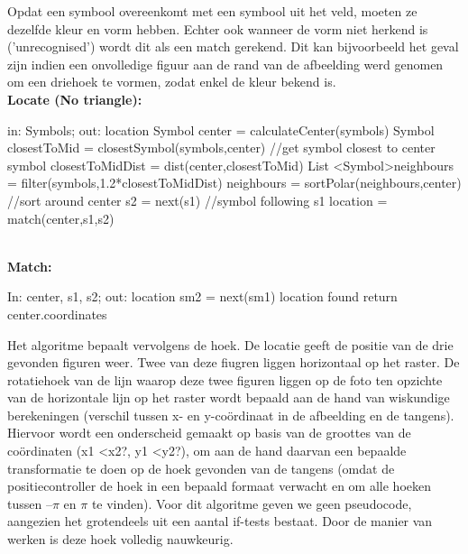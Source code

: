 \documentclass[eind]{penoverslag}
\begin{document}
Opdat een symbool overeenkomt met een symbool uit het veld, moeten ze dezelfde kleur en vorm hebben. Echter ook wanneer de vorm niet herkend is ('unrecognised') wordt dit als een match gerekend. Dit kan bijvoorbeeld het geval zijn indien een onvolledige figuur aan de rand van de afbeelding werd genomen om een driehoek te vormen, zodat enkel de kleur bekend is. \\

\textbf{Locate (No triangle): }
\begin{algorithmic}

	\STATE in: Symbols; out: location
	\STATE Symbol center = calculateCenter(symbols)
	\STATE Symbol closestToMid = closestSymbol(symbols,center)     //get symbol closest to center symbol
	\STATE closestToMidDist = dist(center,closestToMid)
	\STATE List \textless Symbol\textgreater neighbours = filter(symbols,1.2*closestToMidDist)
	\STATE neighbours = sortPolar(neighbours,center)     //sort around center
		\STATE s2 = next(s1) //symbol following s1
			\STATE location = match(center,s1,s2)
		\ENDIF
	\ENDFOR
	
\end{algorithmic}
~\\
\textbf{Match:}
\begin{algorithmic}
\STATE In: center, s1, s2; out: location
				\STATE sm2 = next(sm1)
					\STATE location found
					\STATE return center.coordinates
				\ENDIF
			\ENDFOR
		\ENDIF
	\ENDFOR
\end{algorithmic}

Het algoritme bepaalt vervolgens de hoek. De locatie geeft de positie van de drie gevonden figuren weer. Twee van deze fiugren liggen horizontaal op het raster. De rotatiehoek van de lijn waarop deze twee figuren liggen op de foto ten opzichte van de horizontale lijn op het raster wordt bepaald aan de hand van wiskundige berekeningen (verschil tussen x- en y-co\"ordinaat in de afbeelding en de tangens).\\

Hiervoor wordt een onderscheid gemaakt op basis van de groottes van de co\"ordinaten (x1 \textless  x2?, y1 \textless  y2?), om aan de hand daarvan een bepaalde transformatie te doen op de hoek gevonden van de tangens (omdat de positiecontroller de hoek in een bepaald formaat verwacht en om alle hoeken tussen $–\pi$ en $\pi$ te vinden). Voor dit algoritme geven we geen pseudocode, aangezien het grotendeels uit een aantal if-tests bestaat. Door de manier van werken is deze hoek volledig nauwkeurig. \\
\end{document}
